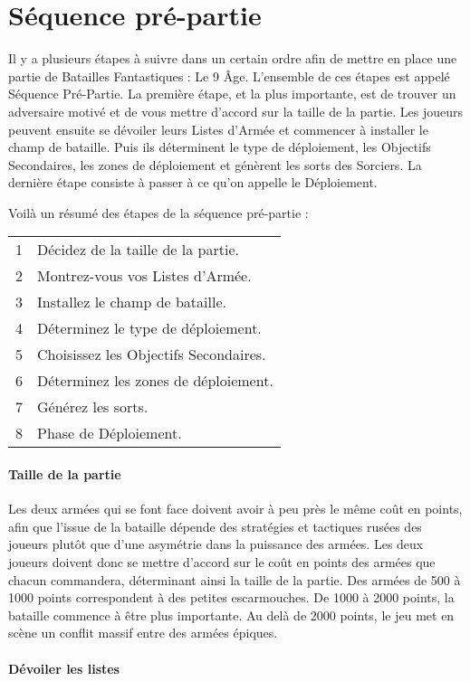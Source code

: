 
\part{Séquence pré-partie}

Il y a plusieurs étapes à suivre dans un certain ordre afin de mettre en place une partie de Batailles Fantastiques : Le 9\ieme{} Âge. L'ensemble de ces étapes est appelé Séquence Pré-Partie. La première étape, et la plus importante, est de trouver un adversaire motivé et de vous mettre d'accord sur la taille de la partie. Les joueurs peuvent ensuite se dévoiler leurs Listes d'Armée et commencer à installer le champ de bataille. Puis ils déterminent le type de déploiement, les Objectifs Secondaires, les zones de déploiement et génèrent les sorts des Sorciers. La dernière étape consiste à passer à ce qu'on appelle le Déploiement.

Voilà un résumé des étapes de la séquence pré-partie :

\hspace*{0.3cm}
\begin{tabular}{c|l}
1 & Décidez de la taille de la partie. \tabularnewline
2 & Montrez-vous vos Listes d'Armée. \tabularnewline
3 & Installez le champ de bataille. \tabularnewline
4 & Déterminez le type de déploiement. \tabularnewline
5 & Choisissez les Objectifs Secondaires. \tabularnewline
6 & Déterminez les zones de déploiement. \tabularnewline
7 & Générez les sorts. \tabularnewline
8 & Phase de Déploiement. \tabularnewline
\end{tabular}

\subsection{Taille de la partie}

Les deux armées qui se font face doivent avoir à peu près le même coût en points, afin que l'issue de la bataille dépende des stratégies et tactiques rusées des joueurs plutôt que d'une asymétrie dans la puissance des armées. Les deux joueurs doivent donc se mettre d'accord sur le coût en points des armées que chacun commandera, déterminant ainsi la taille de la partie. Des armées de 500 à 1000 points correspondent à des petites escarmouches. De 1000 à 2000 points, la bataille commence à être plus importante. Au delà de 2000 points, le jeu met en scène un conflit massif entre des armées épiques.

\subsection{Dévoiler les listes}

